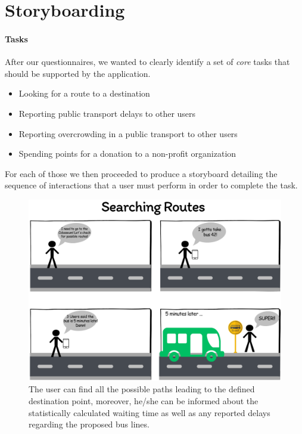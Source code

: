 \documentclass[a4paper, 11pt]{report}
\newenvironment{titlebox}[1][]{%
  \centering
  \basecolorbox[#1]%
}{%
  \endbasecolorbox%
}
\begin{document}
\section{Storyboarding}\label{sec:storyboarding}

\paragraph{Tasks}

After our questionnaires, we wanted to clearly identify a set of \emph{core} tasks that should be
supported by the application.

\begin{titlebox}[The Tasks:]
	\begin{itemize}\label{list:tasks}
		\item Looking for a route to a destination
		\item Reporting public transport delays to other users
		\item Reporting overcrowding in a public transport to other users
		\item Spending points for a donation to a non-profit organization
	\end{itemize}
\end{titlebox}


For each of those we then proceeded to produce a storyboard detailing the sequence of
interactions that a user must perform in order to complete the task.
\newpage%


\vspace{2cm}
\begin{figure}[H]
	\centering
	\includegraphics[width=.9\textwidth]{img/storyboards/storyboard_searching_routes.png}%
	\caption{The user can find all the possible paths leading to the defined destination point, moreover, he/she can be informed about the statistically calculated waiting time as well as any reported delays regarding the proposed bus lines.}\label{fig:a}
\end{figure}
\newpage%
\end{document}
